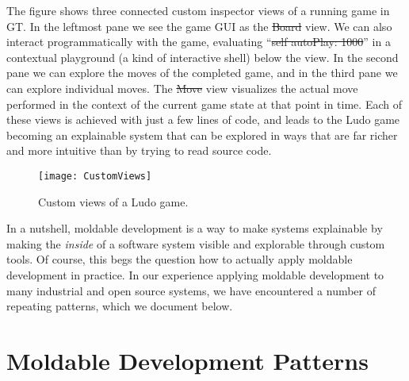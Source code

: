 \documentclass[acmsmall,screen,authorversion,nonacm]{acmart} %
\newcommand\rb[1]{\nbc{Ralf}{#1}{teal}}
\newcommand\cp[1]{\nbe{Cesare}{#1}{olive}} %
\begin{document}
The figure shows three connected custom inspector views
of a running game in GT.
In the leftmost pane we see the game GUI as the \st{Board} view.
We can also interact programmatically with the game, evaluating ``\st{self autoPlay: 1000}'' in a contextual playground (a kind of interactive shell) below the view.
In the second pane we can explore the moves of  the completed game, and in the third pane we can explore individual moves.
The \st{Move} view visualizes the actual move performed in the context of the current game state at that point in time.
Each of these views is achieved with just a few lines of code, and leads to the Ludo game becoming an explainable system that can be explored in ways that are far richer and more intuitive than by trying to read source code.

\begin{figure}[h]
  \texttt{[image: CustomViews]}
  \caption{Custom views of a Ludo game.}
  \label{fig:ludoViews}
\end{figure}


In a nutshell, moldable development is a way to make systems explainable by making the \emph{inside} of a software system visible and explorable through custom tools.
Of course, this begs the question how to actually apply moldable development in practice.
In our experience applying moldable development to many industrial and open source systems, we have encountered a number of repeating patterns, which we document below.

\section{Moldable Development Patterns}

\end{document}
